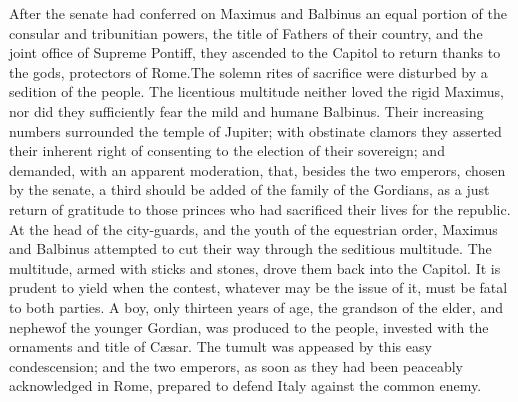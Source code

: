 After the senate had conferred on Maximus and Balbinus an equal
portion of the consular and tribunitian powers, the title of
Fathers of their country, and the joint office of Supreme
Pontiff, they ascended to the Capitol to return thanks to the
gods, protectors of Rome.\footnotemark[30] The solemn rites of sacrifice were
disturbed by a sedition of the people. The licentious multitude
neither loved the rigid Maximus, nor did they sufficiently fear
the mild and humane Balbinus. Their increasing numbers surrounded
the temple of Jupiter; with obstinate clamors they asserted their
inherent right of consenting to the election of their sovereign;
and demanded, with an apparent moderation, that, besides the two
emperors, chosen by the senate, a third should be added of the
family of the Gordians, as a just return of gratitude to those
princes who had sacrificed their lives for the republic. At the
head of the city-guards, and the youth of the equestrian order,
Maximus and Balbinus attempted to cut their way through the
seditious multitude. The multitude, armed with sticks and stones,
drove them back into the Capitol. It is prudent to yield when the
contest, whatever may be the issue of it, must be fatal to both
parties. A boy, only thirteen years of age, the grandson of the
elder, and nephew\footnotemark[301] of the younger Gordian, was produced to the
people, invested with the ornaments and title of Cæsar. The
tumult was appeased by this easy condescension; and the two
emperors, as soon as they had been peaceably acknowledged in
Rome, prepared to defend Italy against the common enemy.



